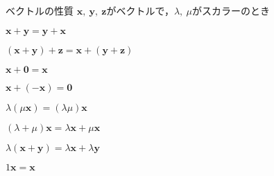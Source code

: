 \begin{kousiki}{ベクトルの性質}
	$\bm{x},\ \bm{y},\ \bm{z}$がベクトルで，$\lambda,\ \mu$がスカラーのとき
	\begin{enumerate}[label=\textbf{[\arabic*]}, labelsep=10pt, leftmargin=23pt]
		\item $\bm{x} + \bm{y} = \bm{y} + \bm{x}$
		\item $(\bm{x} + \bm{y}) + \bm{z} = \bm{x} + (\bm{y} + \bm{z})$
		\item $\bm{x} + \bm{0} = \bm{x}$
		\item $\bm{x} + (-\bm{x}) = \bm{0}$
		\item $\lambda(\mu\bm{x}) = (\lambda\mu)\bm{x}$
		\item $(\lambda + \mu)\bm{x} = \lambda\bm{x} + \mu\bm{x}$
		\item $\lambda(\bm{x} + \bm{y}) = \lambda\bm{x} + \lambda\bm{y}$
		\item $1\bm{x} = \bm{x}$
	\end{enumerate}
\end{kousiki}
